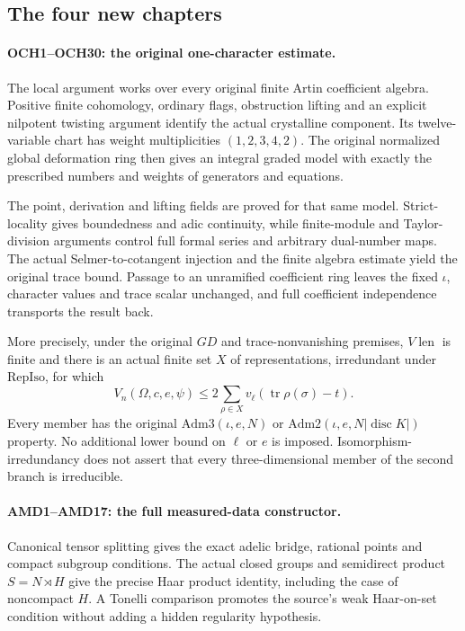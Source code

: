 \documentclass[11pt,a4paper]{article}
\numberwithin{equation}{section}
\theoremstyle{remark}\newtheorem{remark}[theorem]{Remark}
\begin{document}
\subsection{The four new chapters}

\paragraph{OCH1--OCH30: the original one-character estimate.}
The local argument works over every original finite Artin coefficient
algebra. Positive finite cohomology, ordinary flags, obstruction
lifting and an explicit nilpotent twisting argument identify the
actual crystalline component. Its twelve-variable chart has weight
multiplicities \((1,2,3,4,2)\). The original normalized global
deformation ring then gives an integral graded model with exactly
the prescribed numbers and weights of generators and equations.

The point, derivation and lifting fields are proved for that same
model. Strict-locality gives boundedness and adic continuity, while
finite-module and Taylor-division arguments control full formal
series and arbitrary dual-number maps. The actual Selmer-to-cotangent
injection and the finite algebra estimate yield the original trace
bound. Passage to an unramified coefficient ring leaves the fixed
\(\iota\), character values and trace scalar unchanged, and full
coefficient independence transports the result back.

More precisely, under the original \(GD\) and trace-nonvanishing
premises, \(V\!\operatorname{len}\) is finite and there is an actual
finite set \(X\) of representations, irredundant under
\(\mathrm{RepIso}\), for which
\[
 V_n(\Omega,c,e,\psi)
 \le 2\sum_{\rho\in X}
   v_\ell\!\left(\operatorname{tr}\rho(\sigma)-t\right).
\]
Every member has the original \(\mathrm{Adm3}(\iota,e,N)\) or
\(\mathrm{Adm2}(\iota,e,N|\operatorname{disc}K|)\) property.
No additional lower bound on \(\ell\) or \(e\) is imposed.
Isomorphism-irredundancy does not assert that every three-dimensional
member of the second branch is irreducible.

\paragraph{AMD1--AMD17: the full measured-data constructor.}
Canonical tensor splitting gives the exact adelic bridge, rational
points and compact subgroup conditions. The actual closed groups
and semidirect product \(S=N\rtimes H\) give the precise Haar
product identity, including the case of noncompact \(H\).
A Tonelli comparison promotes the source's weak Haar-on-set condition
without adding a hidden regularity hypothesis.
\end{document}
